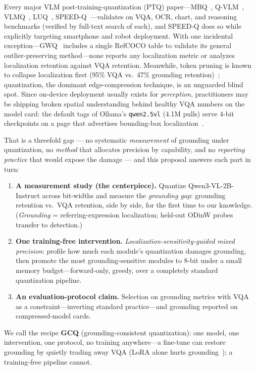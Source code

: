 \documentclass{article}
\begin{document}
Every major VLM post-training-quantization (PTQ) paper---MBQ~\cite{mbq}, Q-VLM~\cite{qvlm}, VLMQ~\cite{vlmq}, LUQ~\cite{luq}, SPEED-Q~\cite{speedq}---validates on VQA, OCR, chart, and reasoning benchmarks (verified by full-text search of each), and SPEED-Q does so while explicitly targeting smartphone and robot deployment. With one incidental exception---GWQ~\cite{gwq} includes a single RefCOCO table to validate its general outlier-preserving method---none reports any localization metric or analyzes localization retention against VQA retention. Meanwhile, token pruning is known to collapse localization first (95\% VQA vs.\ 47\% grounding retention)~\cite{nuwa,feather}; quantization, the dominant edge-compression technique, is an unguarded blind spot. Since on-device deployment usually exists for \emph{perception}, practitioners may be shipping broken spatial understanding behind healthy VQA numbers on the model card: the default tags of Ollama's \texttt{qwen2.5vl} (4.1M pulls) serve 4-bit checkpoints on a page that advertises bounding-box localization~\cite{ollamaqwen}.

That is a threefold gap --- no systematic \emph{measurement} of grounding under quantization, no \emph{method} that allocates precision by capability, and no \emph{reporting practice} that would expose the damage --- and this proposal answers each part in turn:
\begin{enumerate}
  \item \textbf{A measurement study (the centerpiece).} Quantize Qwen3-VL-2B-Instruct across bit-widths and measure the \emph{grounding gap}: grounding retention vs.\ VQA retention, side by side, for the first time to our knowledge. (\emph{Grounding} = referring-expression localization; held-out ODinW probes transfer to detection.)
  \item \textbf{One training-free intervention.} \emph{Localization-sensitivity-guided mixed precision}: profile how much each module's quantization damages grounding, then promote the most grounding-sensitive modules to 8-bit under a small memory budget---forward-only, greedy, over a completely standard quantization pipeline.
  \item \textbf{An evaluation-protocol claim.} Selection on grounding metrics with VQA as a constraint---inverting standard practice---and grounding reported on compressed-model cards.
\end{enumerate}

We call the recipe \textbf{GCQ} (grounding-consistent quantization): one model, one intervention, one protocol, no training anywhere---a fine-tune can restore grounding by quietly trading away VQA (LoRA alone hurts grounding~\cite{miniinternvl}); a training-free pipeline cannot.
\end{document}

